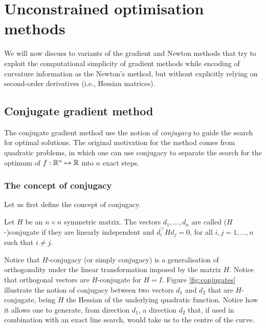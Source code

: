 
\section{Unconstrained optimisation methods}

We will now discuss to variants of the gradient and Newton methods that try to exploit the computational simplicity of gradient methods while encoding of curvature information as the Newton's method, but without explicitly relying on second-order derivatives (i.e., Hessian matrices).

\subsection{Conjugate gradient method}

The conjugate gradient method use the notion of \emph{conjugacy} to guide the search for optimal solutions. The original motivation for the method comes from quadratic problems, in which one can use conjugacy to separate the search for the optimum of $f:\mathbb{R}^n \mapsto \mathbb{R}$ into $n$ exact steps. 

\subsubsection{The concept of conjugacy}

Let us first define the concept of conjugacy.
%
\begin{definition}
Let $H$ be an $n \times n$ symmetric matrix. The vectors $d_1, \dots, d_n$ are called ($H$-)conjugate if they are linearly independent and $d_i^\top Hd_j = 0$, for all $i,j = 1,\dots,n$ such that $i \neq j$. 
\end{definition}

Notice that $H$-conjugacy (or simply conjugacy) is a generalisation of orthogonality under the linear transformation imposed by the matrix $H$. Notice that orthogonal vectors are $H$-conjugate for $H = I$. Figure \ref{fig:conjugates} illustrate the notion of conjugacy between two vectors $d_1$ and $d_2$ that are $H$-conjugate, being $H$ the Hessian of the underlying quadratic function. Notice how it allows one to generate, from direction $d_1$, a direction $d_2$ that, if used in combination with an exact line search, would take us to the centre of the curve.

